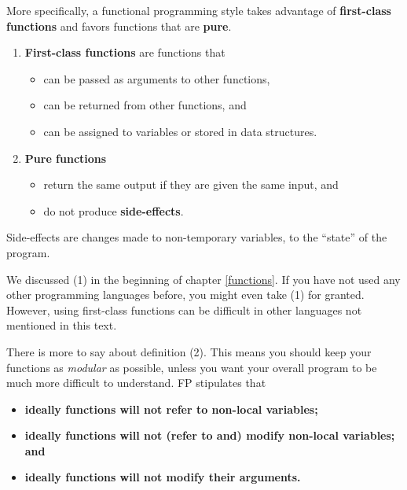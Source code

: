 \documentclass[12pt,krantz2]{krantz}
\providecommand{\tightlist}{%
  \setlength{\itemsep}{0pt}\setlength{\parskip}{0pt}}
\begin{document}
More specifically, a functional programming style takes advantage of \textbf{first-class functions} and favors functions that are \textbf{pure}.

\begin{enumerate}
\def\labelenumi{\arabic{enumi}.}
\tightlist
\item
  \textbf{First-class functions} are \citep{struc_and_interp} functions that

  \begin{itemize}
  \tightlist
  \item
    can be passed as arguments to other functions,
  \item
    can be returned from other functions, and
  \item
    can be assigned to variables or stored in data structures.
  \end{itemize}
\item
  \textbf{Pure functions}

  \begin{itemize}
  \tightlist
  \item
    return the same output if they are given the same input, and
  \item
    do not produce \textbf{side-effects}.
  \end{itemize}
\end{enumerate}

Side-effects are changes made to non-temporary variables, to the ``state'' of the program.

We discussed (1) in the beginning of chapter \ref{functions}. If you have not used any other programming languages before, you might even take (1) for granted. However, using first-class functions can be difficult in other languages not mentioned in this text.

There is more to say about definition (2). This means you should keep your functions as \emph{modular} as possible, unless you want your overall program to be much more difficult to understand. FP stipulates that

\begin{itemize}
\item
  \textbf{ideally functions will not refer to non-local variables;}
\item
  \textbf{ideally functions will not (refer to and) modify non-local variables; and}
\item
  \textbf{ideally functions will not modify their arguments.}
\end{itemize}
\end{document}
